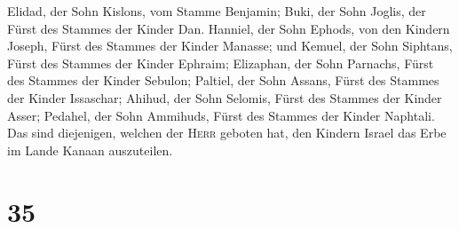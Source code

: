  Elidad, der Sohn Kislons, vom Stamme Benjamin;
 Buki, der Sohn Joglis, der Fürst des Stammes der Kinder
Dan.  Hanniel, der Sohn Ephods, von den Kindern Joseph,
Fürst des Stammes der Kinder Manasse;  und Kemuel, der
Sohn Siphtans, Fürst des Stammes der Kinder Ephraim; 
Elizaphan, der Sohn Parnachs, Fürst des Stammes der Kinder Sebulon;
 Paltiel, der Sohn Assans, Fürst des Stammes der Kinder
Issaschar;  Ahihud, der Sohn Selomis, Fürst des Stammes
der Kinder Asser;  Pedahel, der Sohn Ammihuds, Fürst des
Stammes der Kinder Naphtali.  Das sind diejenigen,
welchen der \textsc{Herr} geboten hat, den Kindern Israel das Erbe im
Lande Kanaan auszuteilen.

\hypertarget{section-34}{%
\section{35}\label{section-34}}

